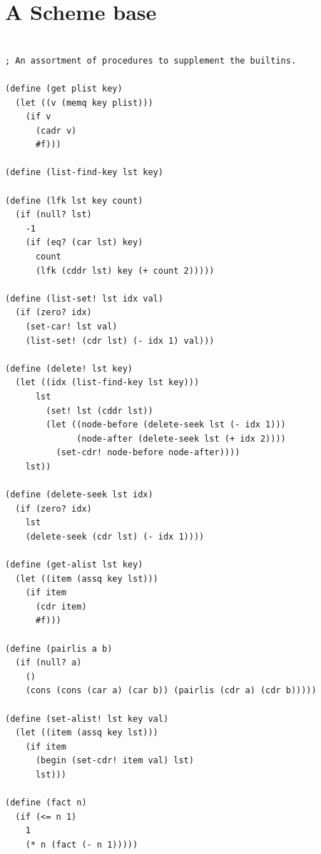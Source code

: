 \documentclass[twoside,9pt]{report}
\begin{document}
\chapter{A Scheme base}
\label{a-scheme-base}
\noindent\makebox[\linewidth]{\rule{\linewidth}{0.4pt}}
\begin{lstlisting}
 
; An assortment of procedures to supplement the builtins.
 
(define (get plist key)
  (let ((v (memq key plist)))
    (if v
      (cadr v)
      #f)))
 
(define (list-find-key lst key)
 
(define (lfk lst key count)
  (if (null? lst)
    -1
    (if (eq? (car lst) key)
      count
      (lfk (cddr lst) key (+ count 2)))))
 
(define (list-set! lst idx val)
  (if (zero? idx)
    (set-car! lst val)
    (list-set! (cdr lst) (- idx 1) val)))
 
(define (delete! lst key)
  (let ((idx (list-find-key lst key)))
      lst
        (set! lst (cddr lst))
        (let ((node-before (delete-seek lst (- idx 1)))
              (node-after (delete-seek lst (+ idx 2))))
          (set-cdr! node-before node-after))))
    lst))
 
(define (delete-seek lst idx)
  (if (zero? idx)
    lst
    (delete-seek (cdr lst) (- idx 1))))
 
(define (get-alist lst key)
  (let ((item (assq key lst)))
    (if item
      (cdr item)
      #f)))
 
(define (pairlis a b)
  (if (null? a)
    ()
    (cons (cons (car a) (car b)) (pairlis (cdr a) (cdr b)))))
 
(define (set-alist! lst key val)
  (let ((item (assq key lst)))
    (if item
      (begin (set-cdr! item val) lst)
      lst)))
 
(define (fact n)
  (if (<= n 1)
    1
    (* n (fact (- n 1)))))
 
\end{lstlisting}
\noindent\makebox[\linewidth]{\rule{\linewidth}{0.4pt}}
\end{document}
